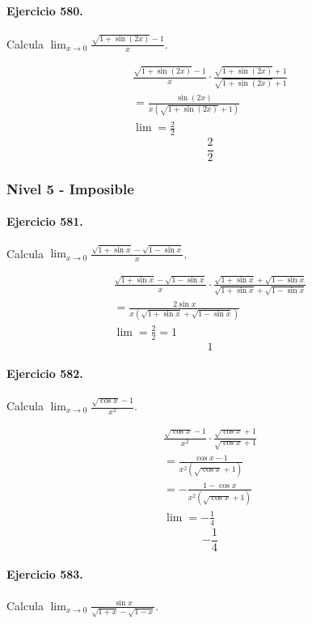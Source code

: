 \documentclass[11pt,a4paper]{article}
\begin{document}
\paragraph{Ejercicio 580.} Calcula $\displaystyle\lim_{x\to0}\frac{\sqrt{1+\sin(2x)}-1}{x}$.

\[
\begin{aligned}
\frac{\sqrt{1+\sin(2x)}-1}{x}\cdot \frac{\sqrt{1+\sin(2x)}+1}{\sqrt{1+\sin(2x)}+1}\\
=\frac{\sin(2x)}{x(\sqrt{1+\sin(2x)}+1)}\\
\lim=\frac{2}{2}
\end{aligned}
\]
\[\boxed{\frac{2}{2}}\]


\newpage

\subsubsection*{Nivel 5 - Imposible}

\paragraph{Ejercicio 581.} Calcula $\displaystyle \lim_{x\to0}\frac{\sqrt{1+\sin x}-\sqrt{1-\sin x}}{x}$.

\[
\begin{aligned}
\frac{\sqrt{1+\sin x}-\sqrt{1-\sin x}}{x}\cdot\frac{\sqrt{1+\sin x}+\sqrt{1-\sin x}}{\sqrt{1+\sin x}+\sqrt{1-\sin x}}\\
=\frac{2\sin x}{x(\sqrt{1+\sin x}+\sqrt{1-\sin x})}\\
\lim=\frac{2}{2}=1
\end{aligned}
\]
\[\boxed{1}\]


\paragraph{Ejercicio 582.} Calcula $\displaystyle \lim_{x\to0}\frac{\sqrt{\cos x}-1}{x^2}$.

\[
\begin{aligned}
\frac{\sqrt{\cos x}-1}{x^2}\cdot\frac{\sqrt{\cos x}+1}{\sqrt{\cos x}+1}\\
=\frac{\cos x-1}{x^2(\sqrt{\cos x}+1)}\\
=-\frac{1-\cos x}{x^2(\sqrt{\cos x}+1)}\\
\lim=-\frac14
\end{aligned}
\]
\[\boxed{-\frac14}\]


\paragraph{Ejercicio 583.} Calcula $\displaystyle \lim_{x\to0}\frac{\sin x}{\sqrt{1+x}-\sqrt{1-x}}$.
\end{document}

